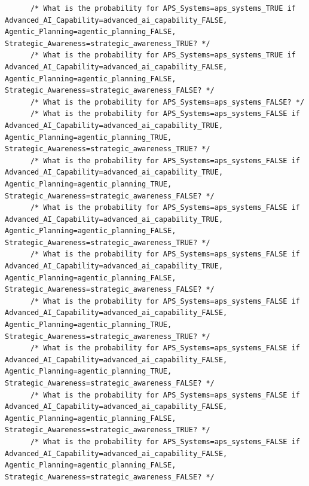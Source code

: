 \documentclass[
  11pt,
  letterpaper,
]{book}
\begin{document}
\begin{landscape}
\begin{verbatim}
      /* What is the probability for APS_Systems=aps_systems_TRUE if Advanced_AI_Capability=advanced_ai_capability_FALSE, Agentic_Planning=agentic_planning_FALSE, Strategic_Awareness=strategic_awareness_TRUE? */
      /* What is the probability for APS_Systems=aps_systems_TRUE if Advanced_AI_Capability=advanced_ai_capability_FALSE, Agentic_Planning=agentic_planning_FALSE, Strategic_Awareness=strategic_awareness_FALSE? */
      /* What is the probability for APS_Systems=aps_systems_FALSE? */
      /* What is the probability for APS_Systems=aps_systems_FALSE if Advanced_AI_Capability=advanced_ai_capability_TRUE, Agentic_Planning=agentic_planning_TRUE, Strategic_Awareness=strategic_awareness_TRUE? */
      /* What is the probability for APS_Systems=aps_systems_FALSE if Advanced_AI_Capability=advanced_ai_capability_TRUE, Agentic_Planning=agentic_planning_TRUE, Strategic_Awareness=strategic_awareness_FALSE? */
      /* What is the probability for APS_Systems=aps_systems_FALSE if Advanced_AI_Capability=advanced_ai_capability_TRUE, Agentic_Planning=agentic_planning_FALSE, Strategic_Awareness=strategic_awareness_TRUE? */
      /* What is the probability for APS_Systems=aps_systems_FALSE if Advanced_AI_Capability=advanced_ai_capability_TRUE, Agentic_Planning=agentic_planning_FALSE, Strategic_Awareness=strategic_awareness_FALSE? */
      /* What is the probability for APS_Systems=aps_systems_FALSE if Advanced_AI_Capability=advanced_ai_capability_FALSE, Agentic_Planning=agentic_planning_TRUE, Strategic_Awareness=strategic_awareness_TRUE? */
      /* What is the probability for APS_Systems=aps_systems_FALSE if Advanced_AI_Capability=advanced_ai_capability_FALSE, Agentic_Planning=agentic_planning_TRUE, Strategic_Awareness=strategic_awareness_FALSE? */
      /* What is the probability for APS_Systems=aps_systems_FALSE if Advanced_AI_Capability=advanced_ai_capability_FALSE, Agentic_Planning=agentic_planning_FALSE, Strategic_Awareness=strategic_awareness_TRUE? */
      /* What is the probability for APS_Systems=aps_systems_FALSE if Advanced_AI_Capability=advanced_ai_capability_FALSE, Agentic_Planning=agentic_planning_FALSE, Strategic_Awareness=strategic_awareness_FALSE? */

\end{verbatim}
\end{landscape}
\end{document}

